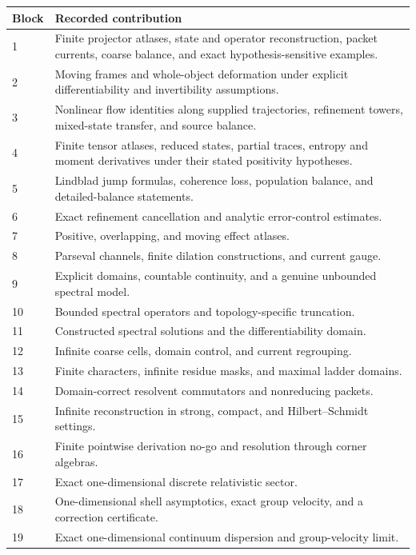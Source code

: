 \begin{longtable}{@{}p{}p{}@{}}
\toprule
Block & Recorded contribution\\
\midrule
\endhead
1 & Finite projector atlases, state and operator reconstruction, packet currents, coarse balance, and exact hypothesis-sensitive examples.\\[2pt]
2 & Moving frames and whole-object deformation under explicit differentiability and invertibility assumptions.\\[2pt]
3 & Nonlinear flow identities along supplied trajectories, refinement towers, mixed-state transfer, and source balance.\\[2pt]
4 & Finite tensor atlases, reduced states, partial traces, entropy and moment derivatives under their stated positivity hypotheses.\\[2pt]
5 & Lindblad jump formulas, coherence loss, population balance, and detailed-balance statements.\\[2pt]
6 & Exact refinement cancellation and analytic error-control estimates.\\[2pt]
7 & Positive, overlapping, and moving effect atlases.\\[2pt]
8 & Parseval channels, finite dilation constructions, and current gauge.\\[2pt]
9 & Explicit domains, countable continuity, and a genuine unbounded spectral model.\\[2pt]
10 & Bounded spectral operators and topology-specific truncation.\\[2pt]
11 & Constructed spectral solutions and the differentiability domain.\\[2pt]
12 & Infinite coarse cells, domain control, and current regrouping.\\[2pt]
13 & Finite characters, infinite residue masks, and maximal ladder domains.\\[2pt]
14 & Domain-correct resolvent commutators and nonreducing packets.\\[2pt]
15 & Infinite reconstruction in strong, compact, and Hilbert--Schmidt settings.\\[2pt]
16 & Finite pointwise derivation no-go and resolution through corner algebras.\\[2pt]
17 & Exact one-dimensional discrete relativistic sector.\\[2pt]
18 & One-dimensional shell asymptotics, exact group velocity, and a correction certificate.\\[2pt]
19 & Exact one-dimensional continuum dispersion and group-velocity limit.\\[2pt]

\end{longtable}
